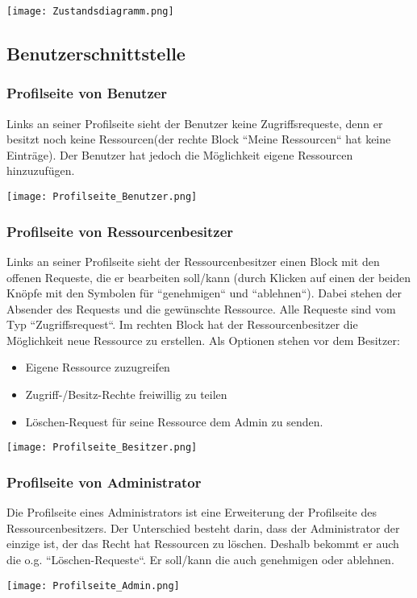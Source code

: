 \documentclass[parskip=full,11pt]{scrartcl}
\begin{document}
	\begin{center}
	\texttt{[image: Zustandsdiagramm.png]}
	\end{center}
	\newpage
\subsection{Benutzerschnittstelle}

\subsubsection*{Profilseite von Benutzer}
Links an seiner Profilseite sieht der Benutzer keine Zugriffsrequeste, denn er besitzt noch keine Ressourcen(der rechte Block ``Meine Ressourcen`` hat keine Einträge). Der Benutzer hat jedoch die Möglichkeit eigene Ressourcen hinzuzufügen.
	\begin{center}
	\texttt{[image: Profilseite\_Benutzer.png]}
	\end{center}
	
\subsubsection*{Profilseite von Ressourcenbesitzer}

Links an seiner Profilseite sieht der Ressourcenbesitzer einen Block mit den offenen Requeste, die er bearbeiten soll/kann (durch Klicken auf einen der beiden Knöpfe mit den Symbolen für ``genehmigen`` und ``ablehnen``). Dabei stehen der Absender des Requests und die gewünschte Ressource. Alle Requeste sind vom Typ ``Zugriffsrequest``. Im rechten Block hat der Ressourcenbesitzer die Möglichkeit neue Ressource zu erstellen. Als Optionen stehen vor dem Besitzer:
\begin{itemize}
	\item Eigene Ressource zuzugreifen 
	\item Zugriff-/Besitz-Rechte freiwillig zu teilen 
	\item Löschen-Request für seine Ressource dem Admin zu senden.
\end{itemize} 

	\begin{center}
	\texttt{[image: Profilseite\_Besitzer.png]}
	\end{center}
	
\subsubsection*{Profilseite von Administrator}
Die Profilseite eines Administrators ist eine Erweiterung der Profilseite des Ressourcenbesitzers. Der Unterschied besteht darin, dass der Administrator der einzige ist, der das Recht hat Ressourcen zu löschen. Deshalb bekommt er auch die o.g. ``Löschen-Requeste``. Er soll/kann die auch genehmigen oder ablehnen.
	\begin{center}
	\texttt{[image: Profilseite\_Admin.png]}
	\end{center}
	
\end{document}
